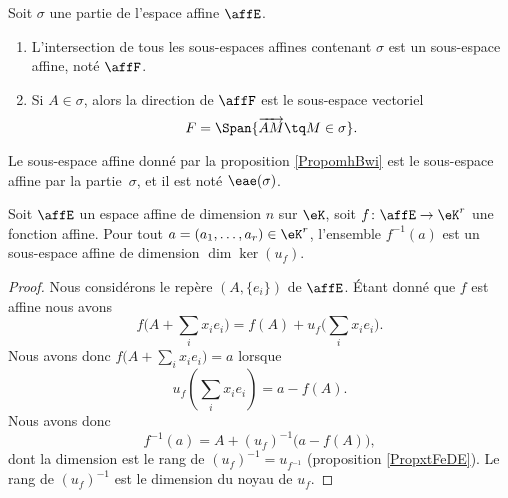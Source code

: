\begin{proposition}      \label{PropomhBwi}
    Soit \( \sigma\) une partie de l'espace affine \( \affE\).
    \begin{enumerate}
        \item
            L'intersection de tous les sous-espaces affines contenant \( \sigma\) est un sous-espace affine, noté \( \affF\).
        \item
            Si \( A\in \sigma\), alors la direction de \( \affF\) est le sous-espace vectoriel 
            \begin{equation}        \label{EqnRAUfg}
                F=\Span\{ \overrightarrow{ AM }\tq M\in \sigma \}.
            \end{equation}
    \end{enumerate}
\end{proposition}
Le sous-espace affine donné par la proposition \ref{PropomhBwi} est le sous-espace affine  par la partie~\( \sigma\), et il est noté \( \eae(\sigma)\). 

\begin{proposition}     \label{PROPooAKJBooMkmsiV}
    Soit \( \affE\) un espace affine de dimension \( n\) sur \( \eK\), soit \( f\colon \affE\to \eK^r\) une fonction affine. Pour tout \( a=(a_1,\ldots, a_r)\in \eK^r\), l'ensemble \( f^{-1}(a)\) est un sous-espace affine de dimension \( \dim\ker(u_f)\).
\end{proposition}

\begin{proof}
    Nous considérons le repère \( (A,\{ e_i \})\) de \( \affE\). Étant donné que \( f\) est affine nous avons
    \begin{equation}
        f\big( A+\sum_ix_ie_i \big)=f(A)+u_f\big( \sum_ix_ie_i \big).
    \end{equation}
    Nous avons donc \( f\big( A+\sum_ix_ie_i \big)=a\) lorsque
    \begin{equation}
        u_f(\sum_ix_ie_i)=a-f(A).
    \end{equation}
    Nous avons donc
    \begin{equation}
        f^{-1}(a)=A+(u_f)^{-1}\big( a-f(A) \big),
    \end{equation}
    dont la dimension est le rang de \( (u_f)^{-1}=u_{f^{-1}}\) (proposition \ref{PropxtFeDE}). Le rang de \( (u_f)^{-1}\) est le dimension du noyau de \( u_f\).
\end{proof}

